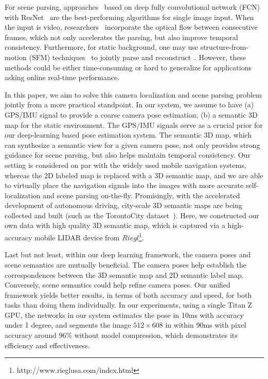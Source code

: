 \documentclass[10pt,twocolumn,letterpaper]{article}
\begin{document}
For scene parsing, approaches~\cite{ZhaoSQWJ16,ChenPSA17} based on deep fully convolutional network (FCN) with ResNet~\cite{HeZRS15} are the best-performing algorithms for single image input. When the input is video, researchers~\cite{kundu2016feature,zhu2016deep} incorporate the optical flow between consecutive frames, which not only accelerates the parsing, but also improve temporal consistency. Furthermore, for static background, one may use structure-from-motion (SFM) techniques~\cite{wu2011visualsfm} to jointly parse and reconstruct~\cite{kundu2014joint}. However, these methods could be either time-consuming or hard to generalize for applications asking online real-time performance.

In this paper, we aim to solve this camera localization and scene parsing problem jointly from a more practical standpoint. In our system, we assume to have (a) GPS/IMU signal to provide a coarse camera pose estimation; (b) a semantic 3D map for the static environment. The GPS/IMU signals serve as a crucial prior for our deep-learning based pose estimation system. The semantic 3D map, which can synthesize a semantic view for a given camera pose, not only provides strong guidance for scene parsing, but also helps maintain temporal consistency.
Our setting is considered on par with the widely used mobile navigation systems, whereas the 2D labeled map is replaced with a 3D semantic map, and we are able to virtually place the navigation signals into the images with more accurate self-localization and scene parsing on-the-fly. 
Promisingly, with the accelerated development of autonomous driving, city-scale 3D semantic maps are being collected and built (such as the TorontoCity dataset~\cite{wang2016torontocity}). Here, we constructed our own data with high quality 3D semantic map, which is captured via a high-accuracy mobile LIDAR device from $Riegl$\footnote{http://www.rieglusa.com/index.html}.

Last but not least, within our deep learning framework, the camera poses and scene semantics are mutually beneficial. The camera poses help establish the correspondences between the 3D semantic map and 2D semantic label map. Conversely, scene semantics could help refine camera poses. Our unified framework yields better results, in terms of both accuracy and speed, for both tasks than doing them individually. In our experiments, using a single Titan Z GPU, the networks in our system estimates the pose in 10ms with accuracy under 1 degree, and segments the image $512 \times 608$ in within 90ms with pixel accuracy around 96$\%$ without model compression, which demonstrates its efficiency and effectiveness.
\end{document}
